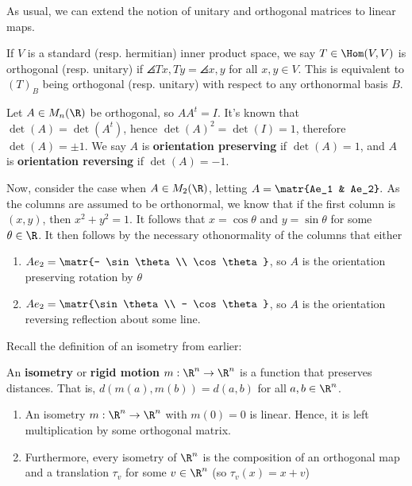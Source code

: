 As usual, we can extend the notion of unitary and orthogonal matrices to linear maps.

\begin{defn}
    If $V$ is a standard (resp. hermitian) inner product space, we say $T\in \Hom(V,V)$ is orthogonal (resp. unitary) if $\angles{Tx,Ty}=\angles{x,y}$ for all $x,y \in V$. This is equivalent to $(T)_B$ being orthogonal (resp. unitary) with respect to any orthonormal basis $B$.
\end{defn}

\begin{ex}
    Let $A \in M_n(\R)$ be orthogonal, so $AA^t=I$. It's known that $\det (A) = \det (A^t)$, hence $\det (A)^2=\det (I)=1$, therefore $\det (A) = \pm 1$. We say $A$ is \textbf{orientation preserving} if $\det (A)= 1$, and $A$ is \textbf{orientation reversing} if $\det (A) = -1$.

    Now, consider the case when $A \in M_2(\R)$, letting $A = \matr{Ae_1 & Ae_2}.$ As the columns are assumed to be orthonormal, we know that if the first column is $(x,y)$, then $x^2+y^2=1$. It follows that $x = \cos \theta$ and $y = \sin \theta$ for some $\theta \in \R$. It then follows by the necessary othonormality of the columns that either
    \begin{enumerate}
        \item[(a)] $Ae_2 = \matr{- \sin \theta \\ \cos \theta}$, so $A$ is the orientation preserving rotation by $\theta$
        \item[(b)] $Ae_2=\matr{\sin \theta \\ - \cos \theta}$, so $A$ is the orientation reversing reflection about some line.
    \end{enumerate}
\end{ex}

Recall the definition of an isometry from earlier:

\begin{defn}
    An \textbf{isometry} or \textbf{rigid motion} $m: \R^n \to \R^n$ is a function that preserves distances. That is, $d(m(a),m(b)) = d(a,b)$ for all $a,b \in \R^n$.
\end{defn}

\begin{thm}
    \begin{enumerate}
        \item[(a)] An isometry $m:\R^n \to \R^n$ with $m(0)=0$ is linear. Hence, it is left multiplication by some orthogonal matrix.
        \item[(b)] Furthermore, every isometry of $\R^n$ is the composition of an orthogonal map and a translation $\tau _v$ for some $v \in \R^n$ (so $\tau_v(x)=x+v$)
    \end{enumerate}
\end{thm}
